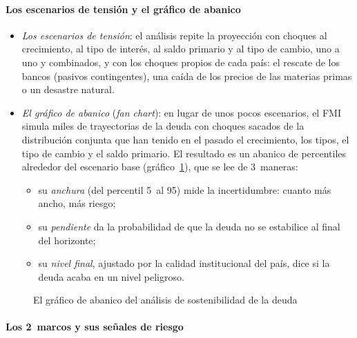 \documentclass[11pt]{article}
\begin{document}
\paragraph{Los escenarios de tensión y el gráfico de abanico}

\begin{itemize}
\item \emph{Los escenarios de tensión}: el análisis repite la proyección con choques al crecimiento, al tipo de interés, al saldo primario y al tipo de cambio, uno a uno y combinados, y con los choques propios de cada país: el rescate de los bancos (pasivos contingentes), una caída de los precios de las materias primas o un desastre natural.
\item \emph{El gráfico de abanico} (\emph{fan chart}): en lugar de unos pocos escenarios, el FMI simula miles de trayectorias de la deuda con choques sacados de la distribución conjunta que han tenido en el pasado el crecimiento, los tipos, el tipo de cambio y el saldo primario. El resultado es un abanico de percentiles alrededor del escenario base (gráfico~\ref{fig:abanico}), que se lee de 3~maneras:
  \begin{itemize}
  \item su \emph{anchura} (del percentil 5~al 95) mide la incertidumbre: cuanto más ancho, más riesgo;
  \item su \emph{pendiente} da la probabilidad de que la deuda no se estabilice al final del horizonte;
  \item su \emph{nivel final}, ajustado por la calidad institucional del país, dice si la deuda acaba en un nivel peligroso.
  \end{itemize}
\end{itemize}

\begin{figure}[H]
\centering
\caption{El gráfico de abanico del análisis de sostenibilidad de la deuda}\label{fig:abanico}
\end{figure}

\paragraph{Los 2~marcos y sus señales de riesgo}
\end{document}
